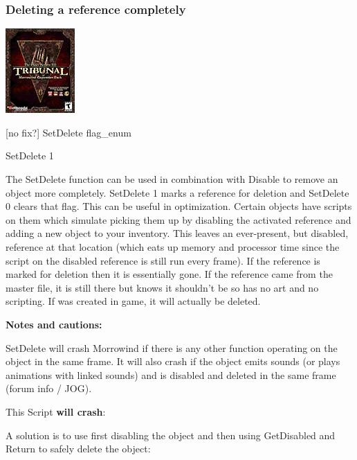 
\hypertarget{deleting-a-reference-completely}{%
\subsubsection{Deleting a reference
completely}\label{deleting-a-reference-completely}}

\includegraphics{media/image6.png}

{[}no fix?{]} SetDelete flag\_enum

SetDelete 1

The SetDelete function can be used in combination with Disable to remove
an object more completely. SetDelete 1 marks a reference for deletion
and SetDelete 0 clears that flag. This can be useful in optimization.
Certain objects have scripts on them which simulate picking them up by
disabling the activated reference and adding a new object to your
inventory. This leaves an ever-present, but disabled, reference at that
location (which eats up memory and processor time since the script on
the disabled reference is still run every frame). If the reference is
marked for deletion then it is essentially gone. If the reference came
from the master file, it is still there but knows it shouldn't be so has
no art and no scripting. If was created in game, it will actually be
deleted.

\textbf{Notes and cautions:}

SetDelete will crash Morrowind if there is any other function operating
on the object in the same frame. It will also crash if the object emits
sounds (or plays animations with linked sounds) and is disabled and
deleted in the same frame (forum info / JOG).

This Script \textbf{will crash}:



A solution is to use first disabling the object and then using
GetDisabled and Return to safely delete the object:

